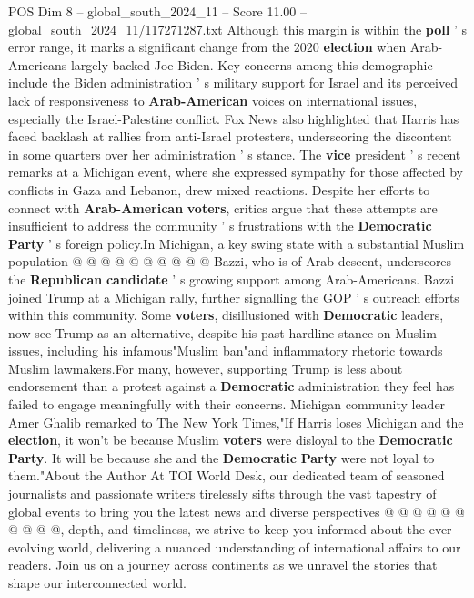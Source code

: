 \begin{textsample}{POS Dim 8 – global\_south\_2024\_11 – Score 11.00 – global\_south\_2024\_11/117271287.txt}
Although this margin is within the \textbf{poll} ' s error range, it marks a significant change from the 2020 \textbf{election} when Arab-Americans largely backed Joe Biden.
Key concerns among this demographic include the Biden administration ' s military support for Israel and its perceived lack of responsiveness to \textbf{Arab-American} voices on international issues, especially the Israel-Palestine conflict.
Fox News also highlighted that Harris has faced backlash at rallies from anti-Israel protesters, underscoring the discontent in some quarters over her administration ' s stance.
The \textbf{vice} president ' s recent remarks at a Michigan event, where she expressed sympathy for those affected by conflicts in Gaza and Lebanon, drew mixed reactions.
Despite her efforts to connect with \textbf{Arab-American} \textbf{voters}, critics argue that these attempts are insufficient to address the community ' s frustrations with the \textbf{Democratic} \textbf{Party} ' s foreign policy.In Michigan, a key swing state with a substantial Muslim population @ @ @ @ @ @ @ @ @ @ Bazzi, who is of Arab descent, underscores the \textbf{Republican} \textbf{candidate} ' s growing support among Arab-Americans.
Bazzi joined Trump at a Michigan rally, further signalling the GOP ' s outreach efforts within this community.
Some \textbf{voters}, disillusioned with \textbf{Democratic} leaders, now see Trump as an alternative, despite his past hardline stance on Muslim issues, including his infamous"Muslim ban"and inflammatory rhetoric towards Muslim lawmakers.For many, however, supporting Trump is less about endorsement than a protest against a \textbf{Democratic} administration they feel has failed to engage meaningfully with their concerns.
Michigan community leader Amer Ghalib remarked to The New York Times,"If Harris loses Michigan and the \textbf{election}, it won't be because Muslim \textbf{voters} were disloyal to the \textbf{Democratic} \textbf{Party}.
It will be because she and the \textbf{Democratic} \textbf{Party} were not loyal to them."About the Author At TOI World Desk, our dedicated team of seasoned journalists and passionate writers tirelessly sifts through the vast tapestry of global events to bring you the latest news and diverse perspectives @ @ @ @ @ @ @ @ @ @, depth, and timeliness, we strive to keep you informed about the ever-evolving world, delivering a nuanced understanding of international affairs to our readers.
Join us on a journey across continents as we unravel the stories that shape our interconnected world.

\end{textsample}
